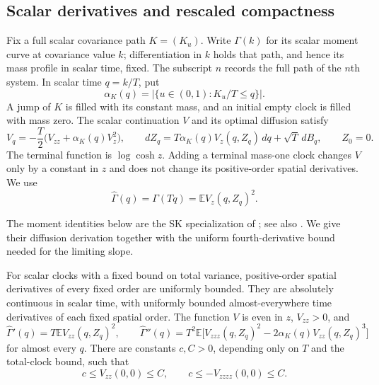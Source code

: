 \subsection{Scalar derivatives and rescaled compactness}

Fix a full scalar covariance path $K=(K_u)$. Write $\Gamma(k)$ for
its scalar moment curve at covariance value $k$; differentiation in $k$
holds that path, and hence its mass profile in scalar time, fixed.
The subscript $n$ records the full path of the $n$th system.
In scalar time $q=k/T$, put
\[
 \alpha_K(q)=|\{u\in(0,1):K_u/T\le q\}|.
\]
A jump of $K$ is filled with its constant mass, and an initial empty
clock is filled with mass zero. The scalar continuation $V$ and its
optimal diffusion satisfy
\[
 V_q=-\frac T2\bigl(V_{zz}+\alpha_K(q)V_z^2\bigr),\qquad
 dZ_q=T\alpha_K(q)V_z(q,Z_q)\,dq+\sqrt T\,dB_q,
 \qquad Z_0=0.
\]
The terminal function is $\log\cosh z$. Adding a terminal mass-one
clock changes $V$ only by a constant in $z$ and does not change its
positive-order spatial derivatives. We use
\[
 \widehat\Gamma(q)=\Gamma(Tq)
       =\mathbb E V_z(q,Z_q)^2.
\]

The moment identities below are the SK specialization of
\cite[Proposition~3]{AuffingerChenProperties2015}; see also
\cite[Lemma~8.4]{JagannathTobasco2017}. We give their diffusion
derivation together with the uniform fourth-derivative bound needed
for the limiting slope.

\begin{lemma}
\label{prof:scalar-derivatives}
For scalar clocks with a fixed bound on total variance, positive-order
spatial derivatives of every fixed order are uniformly bounded.
They are absolutely continuous in scalar time, with uniformly bounded
almost-everywhere time derivatives of each fixed spatial order.
The function $V$ is even in $z$, $V_{zz}>0$, and
\[
 \widehat\Gamma'(q)=T\mathbb E V_{zz}(q,Z_q)^2,
 \qquad
 \widehat\Gamma''(q)=T^2\mathbb E\bigl[
 V_{zzz}(q,Z_q)^2-2\alpha_K(q)V_{zz}(q,Z_q)^3\bigr]
\]
for almost every $q$. There are constants $c,C>0$, depending only on
$T$ and the total-clock bound, such that
\[
 c\le V_{zz}(0,0)\le C,
 \qquad c\le -V_{zzzz}(0,0)\le C.
\]
\end{lemma}

